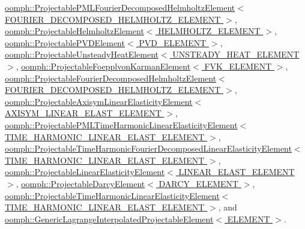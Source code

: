 \hyperlink{classoomph_1_1ProjectablePMLFourierDecomposedHelmholtzElement_a49fec167b648f17be6517f241e0745e6}{oomph\+::\+Projectable\+P\+M\+L\+Fourier\+Decomposed\+Helmholtz\+Element$<$ F\+O\+U\+R\+I\+E\+R\+\_\+\+D\+E\+C\+O\+M\+P\+O\+S\+E\+D\+\_\+\+H\+E\+L\+M\+H\+O\+L\+T\+Z\+\_\+\+E\+L\+E\+M\+E\+N\+T $>$}, \hyperlink{classoomph_1_1ProjectableHelmholtzElement_a8ca133993658d3eefdfd1ab02b55fae7}{oomph\+::\+Projectable\+Helmholtz\+Element$<$ H\+E\+L\+M\+H\+O\+L\+T\+Z\+\_\+\+E\+L\+E\+M\+E\+N\+T $>$}, \hyperlink{classoomph_1_1ProjectablePVDElement_ab786e3176fd618064e5cb35557dc01fe}{oomph\+::\+Projectable\+P\+V\+D\+Element$<$ P\+V\+D\+\_\+\+E\+L\+E\+M\+E\+N\+T $>$}, \hyperlink{classoomph_1_1ProjectableUnsteadyHeatElement_a5e80bbc5a4d70f51fe842bb90f988d31}{oomph\+::\+Projectable\+Unsteady\+Heat\+Element$<$ U\+N\+S\+T\+E\+A\+D\+Y\+\_\+\+H\+E\+A\+T\+\_\+\+E\+L\+E\+M\+E\+N\+T $>$}, \hyperlink{classoomph_1_1ProjectableFoepplvonKarmanElement_a945d9f6e4fe913ca3659b0aceaab9b94}{oomph\+::\+Projectable\+Foepplvon\+Karman\+Element$<$ F\+V\+K\+\_\+\+E\+L\+E\+M\+E\+N\+T $>$}, \hyperlink{classoomph_1_1ProjectableFourierDecomposedHelmholtzElement_a0644ce309555150976c0e5e16ea2dd1f}{oomph\+::\+Projectable\+Fourier\+Decomposed\+Helmholtz\+Element$<$ F\+O\+U\+R\+I\+E\+R\+\_\+\+D\+E\+C\+O\+M\+P\+O\+S\+E\+D\+\_\+\+H\+E\+L\+M\+H\+O\+L\+T\+Z\+\_\+\+E\+L\+E\+M\+E\+N\+T $>$}, \hyperlink{classoomph_1_1ProjectableAxisymLinearElasticityElement_aa2fdf62a0479bffad602ff39df9c7697}{oomph\+::\+Projectable\+Axisym\+Linear\+Elasticity\+Element$<$ A\+X\+I\+S\+Y\+M\+\_\+\+L\+I\+N\+E\+A\+R\+\_\+\+E\+L\+A\+S\+T\+\_\+\+E\+L\+E\+M\+E\+N\+T $>$}, \hyperlink{classoomph_1_1ProjectablePMLTimeHarmonicLinearElasticityElement_a49e06b240732712d0db73340c9f104f0}{oomph\+::\+Projectable\+P\+M\+L\+Time\+Harmonic\+Linear\+Elasticity\+Element$<$ T\+I\+M\+E\+\_\+\+H\+A\+R\+M\+O\+N\+I\+C\+\_\+\+L\+I\+N\+E\+A\+R\+\_\+\+E\+L\+A\+S\+T\+\_\+\+E\+L\+E\+M\+E\+N\+T $>$}, \hyperlink{classoomph_1_1ProjectableTimeHarmonicFourierDecomposedLinearElasticityElement_a4fcccf713843eda6d6cab9c73950d0d1}{oomph\+::\+Projectable\+Time\+Harmonic\+Fourier\+Decomposed\+Linear\+Elasticity\+Element$<$ T\+I\+M\+E\+\_\+\+H\+A\+R\+M\+O\+N\+I\+C\+\_\+\+L\+I\+N\+E\+A\+R\+\_\+\+E\+L\+A\+S\+T\+\_\+\+E\+L\+E\+M\+E\+N\+T $>$}, \hyperlink{classoomph_1_1ProjectableLinearElasticityElement_ab73155dc46dafbc35a71a36c855f5790}{oomph\+::\+Projectable\+Linear\+Elasticity\+Element$<$ L\+I\+N\+E\+A\+R\+\_\+\+E\+L\+A\+S\+T\+\_\+\+E\+L\+E\+M\+E\+N\+T $>$}, \hyperlink{classoomph_1_1ProjectableDarcyElement_aa430ac36ed6a03558d66cae979b57a3f}{oomph\+::\+Projectable\+Darcy\+Element$<$ D\+A\+R\+C\+Y\+\_\+\+E\+L\+E\+M\+E\+N\+T $>$}, \hyperlink{classoomph_1_1ProjectableTimeHarmonicLinearElasticityElement_aa7e723386c104650e9b8f7f3e856786b}{oomph\+::\+Projectable\+Time\+Harmonic\+Linear\+Elasticity\+Element$<$ T\+I\+M\+E\+\_\+\+H\+A\+R\+M\+O\+N\+I\+C\+\_\+\+L\+I\+N\+E\+A\+R\+\_\+\+E\+L\+A\+S\+T\+\_\+\+E\+L\+E\+M\+E\+N\+T $>$}, and \hyperlink{classoomph_1_1GenericLagrangeInterpolatedProjectableElement_abbf541f3b88a4b0acc89f4b6f252de3b}{oomph\+::\+Generic\+Lagrange\+Interpolated\+Projectable\+Element$<$ E\+L\+E\+M\+E\+N\+T $>$}.




